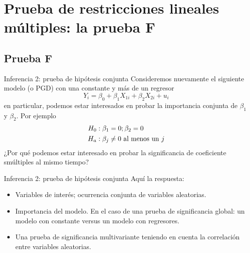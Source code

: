 \section{Prueba de restricciones lineales múltiples: la prueba F}

\subsection{Prueba F}
\begin{frame}{Inferencia 2: prueba de hipótesis conjunta}
	Consideremos nuevamente el siguiente modelo (o PGD) con una constante y más de un regresor
		$$Y_i = \beta_0 + \beta_1 X_{1i} + \beta_2X_{2i} + u_i$$
	en particular, podemos estar interesados en probar la importancia conjunta de $\beta_1$ y $\beta_2$. Por ejemplo
		\begin{align*}
			H_0 & : \beta_1 = 0; \beta_2 = 0\\
			H_a & : \beta_j \neq 0 \textup{ al menos un } j
		\end{align*}
	¿Por qué podemos estar interesado en probar la significancia de coeficiente smúltiples al mismo tiempo?
\end{frame}
\begin{frame}{Inferencia 2: prueba de hipótesis conjunta}
	Aquí la respuesta:
		\begin{itemize}
			\item Variables de interés; ocurrencia conjunta de variables aleatorias.
			\item Importancia del modelo. En el caso de una prueba de significancia global: un modelo con constante versus un modelo con regresores.
			\item Una prueba de significancia multivariante teniendo en cuenta la correlación entre variables aleatorias.
		\end{itemize}
\end{frame}
